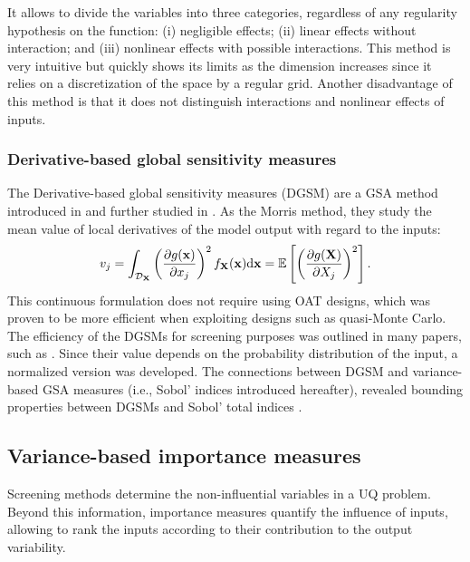It allows to divide the variables into three categories, regardless of any regularity hypothesis on the function: 
(i) negligible effects; (ii) linear effects without interaction; and (iii) nonlinear effects with possible interactions. 
This method is very intuitive but quickly shows its limits as the dimension increases since it relies on a discretization of the space by a regular grid.
Another disadvantage of this method is that it does not distinguish interactions and nonlinear effects of inputs.


\subsubsection{Derivative-based global sensitivity measures}

The Derivative-based global sensitivity measures (DGSM) are a GSA method introduced in \citet{sobol_1995_DGSM} and further studied in \citet{kucherenko_2009_DGSM}. 
As the Morris method, they study the mean value of local derivatives of the model output with regard to the inputs: 
\begin{equation}
    v_j = \int_{\mathcal{D}_{{\bf X}}} \left(\frac{\partial g({\bf x})}{\partial x_j}\right)^2 f_{{\bf X}}({\bf x}) \mathrm{d} {\bf x} = \mathbb{E}\left[\left(\frac{\partial g({\bf X})}{\partial X_j}\right)^2\right].
\end{equation}
This continuous formulation does not require using OAT designs, which was proven to be more efficient when exploiting designs such as quasi-Monte Carlo. 
The efficiency of the DGSMs for screening purposes was outlined in many papers, such as \citet{kucherenko_iooss_2017}. 
Since their value depends on the probability distribution of the input, a normalized version was developed. 
The connections between DGSM and variance-based GSA measures (i.e., Sobol' indices introduced hereafter), revealed bounding properties between DGSMs and Sobol' total indices \citep{lamboni_iooss_2013_DGSM}.

\subsection{Variance-based importance measures}

Screening methods determine the non-influential variables in a UQ problem. 
Beyond this information, importance measures quantify the influence of inputs, allowing to rank the inputs according to their contribution to the output variability.  

